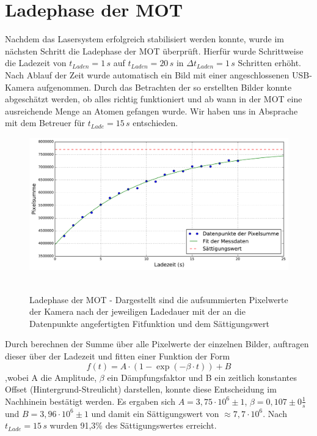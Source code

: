 \documentclass[twoside,colorback,accentcolor=tud4c,11pt]{tudreport}
\begin{document}
\section{Ladephase der MOT}
Nachdem das Lasersystem erfolgreich stabilisiert werden konnte, wurde im nächsten Schritt die Ladephase der MOT überprüft. Hierfür wurde Schrittweise die Ladezeit von $t_{Laden}=1\,\si{s}$ auf $t_{Laden}=20\,\si{s}$ in $\Delta t_{Laden}=1\,\si{s}$ Schritten erhöht. Nach Ablauf der Zeit wurde automatisch ein Bild mit einer angeschlossenen USB-Kamera aufgenommen. Durch das Betrachten der so erstellten Bilder konnte abgeschätzt werden, ob alles richtig funktioniert und ab wann in der MOT eine ausreichende Menge an Atomen gefangen wurde. Wir haben uns in Absprache mit dem Betreuer für $t_{Lade}=15\,\si{s}$ entschieden. 
\begin{figure}[H]
\centering
   	\begin{minipage}[b]{0.85\textwidth}
   	\includegraphics[width=\textwidth]{graphics/laden.pdf}\
   	\end{minipage}
\caption{Ladephase der MOT - Dargestellt sind die aufsummierten Pixelwerte der Kamera nach der jeweiligen Ladedauer mit der an die Datenpunkte angefertigten Fitfunktion und dem Sättigungswert}\label{laden}	
\end{figure}
Durch berechnen der Summe über alle Pixelwerte der einzelnen Bilder, auftragen dieser über der Ladezeit und fitten einer Funktion der Form
\begin{equation}
f(t)=A\cdot\left(1-\exp\left(-\beta\cdot t\right)\right) + B
\end{equation}
,wobei A die Amplitude, $\beta$ ein Dämpfungsfaktor und B ein zeitlich konstantes Offset (Hintergrund-Streulicht) darstellen, konnte diese Entscheidung im Nachhinein bestätigt werden. Es ergaben sich $A=3,75\cdot 10^6 \pm 1$, $\beta=0,107\pm 0 \frac{1}{s}$ und $B=3,96\cdot 10^6 \pm 1$ und damit ein Sättigungswert von $\approx7,7\cdot 10^6$. Nach $t_{Lade}=15\,\si{s}$ wurden 91,3\% des Sättigungswertes erreicht.
\end{document}
